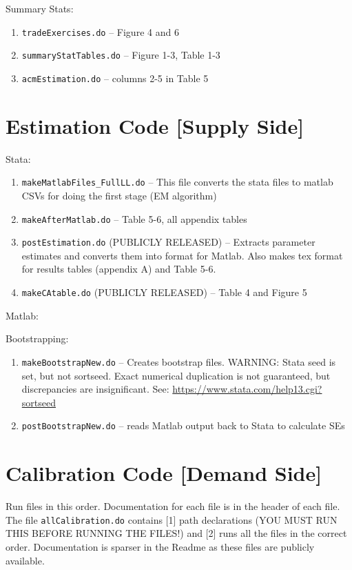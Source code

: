 \documentclass[11pt]{article}
\begin{document}
Summary Stats:
\begin{enumerate}
	\item \verb!tradeExercises.do! -- Figure 4 and 6  
	\item \verb!summaryStatTables.do! -- Figure 1-3, Table 1-3
	\item \verb!acmEstimation.do! -- columns 2-5 in Table 5
\end{enumerate}


\section*{Estimation Code [Supply Side]}
Stata:
\begin{enumerate}
	\item \verb!makeMatlabFiles_FullLL.do! -- This file converts the stata files to matlab CSVs for doing the first stage (EM algorithm)
	\item \verb!makeAfterMatlab.do! -- Table 5-6, all appendix tables
	\item \verb!postEstimation.do! (PUBLICLY RELEASED) -- Extracts parameter estimates and converts them into format for Matlab. Also makes tex format for results tables (appendix A) and Table 5-6.
	\item \verb!makeCAtable.do! (PUBLICLY RELEASED) -- Table 4 and Figure 5
	
\end{enumerate}
Matlab:

Bootstrapping:
\begin{enumerate}
	\item \verb!makeBootstrapNew.do! -- Creates bootstrap files. WARNING: Stata seed is set, but not sortseed. Exact numerical duplication is not guaranteed, but discrepancies are insignificant. See: \href{https://www.stata.com/help13.cgi?sortseed}{https://www.stata.com/help13.cgi?sortseed}
	\item \verb!postBootstrapNew.do! -- reads Matlab output back to Stata to calculate SEs
\end{enumerate}

\section*{Calibration Code [Demand Side]}
Run files in this order. Documentation for each file is in the header of each file. The file \verb!allCalibration.do! contains [1] path declarations (YOU MUST RUN THIS BEFORE RUNNING THE FILES!) and [2] runs all the files in the correct order. Documentation is sparser in the Readme as these files are publicly available.
\end{document}
